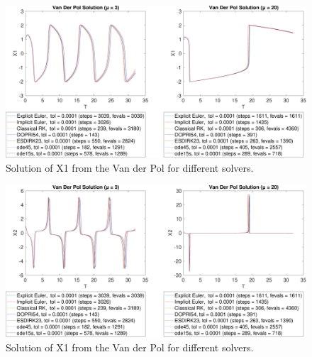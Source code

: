\begin{figure}[H]
    \centering
    \includegraphics[width=\textwidth]{plots/7_5_X1.pdf}
    \caption{Solution of X1 from the Van der Pol for different solvers.}
    \label{fig:7_5x1}
\end{figure}

\begin{figure}[H]
    \centering
    \includegraphics[width=\textwidth]{plots/7_5_X2.pdf}
    \caption{Solution of X1 from the Van der Pol for different solvers.}
    \label{fig:7_5x2}
\end{figure}














